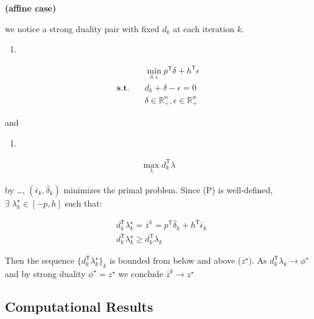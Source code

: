 \documentclass[
  a4paper,
,tablecaptionabove
]{scrartcl}
\numberwithin{equation}{section}
\providecommand{\tightlist}{%
  \setlength{\itemsep}{0pt}\setlength{\parskip}{0pt}}
\begin{document}
\textbf{(affine case)}

we notice a strong duality pair with fixed \(d_k\) at each iteration
\(k\).

\begin{enumerate}
  \def\labelenumi{(\Alph{enumi})}
  \setcounter{enumi}{15}
  \tightlist
  \item
\end{enumerate}

\[\begin{aligned}
                        & \min_{\delta, \epsilon} p^\mathsf{T} \delta + h^\mathsf{T} \epsilon \\
    \mathbf{s.t.} \quad & d_k + \delta - \epsilon = 0                                         \\
                        & \delta \in \mathbb{R}_+^n, \epsilon \in \mathbb{R}_+^n
  \end{aligned}\]

and

\begin{enumerate}
  \def\labelenumi{(\Alph{enumi})}
  \setcounter{enumi}{3}
  \tightlist
  \item
\end{enumerate}

\[\begin{aligned}
    \max_{\lambda} d_k^\mathsf{T} \lambda
  \end{aligned}\]

by \ldots, \((\bar \epsilon_k, \bar \delta_k)\) minimizes the primal
problem. Since (P) is well-defined,
\(\exists\; \lambda_k^\star \in [-p, h]\) such that:

\[\begin{aligned}
     & d_k^\mathsf{T} \lambda_k^\star = \bar z^k = p^\mathsf{T} \bar \delta_k + h^\mathsf{T} \bar \epsilon_k \\
     & d_k^\mathsf{T} \lambda_k^\star \ge  d_k^\mathsf{T} \lambda_k
  \end{aligned}\]

Then the sequence \(\displaystyle\{d_k^\mathsf{T} \lambda_k^\star\}_k\)
is bounded from below and above (\(z^\star\)). As
\(d_k^\mathsf{T} \lambda_k \to \phi^\star\) and by strong duality
\(\phi^\star = z^\star\) we conclude \(\bar z^k \to z^\star\)

\hypertarget{computational-results}{%
  \subsection{Computational Results}\label{computational-results}}
\end{document}
